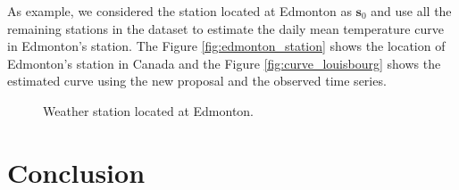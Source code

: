 \documentclass[12pt]{interact}
\theoremstyle{plain}%
\theoremstyle{definition}
\theoremstyle{remark}
\begin{document}
As example, we considered the station located at Edmonton as \(\bm{s}_0\) and use all the remaining stations in the dataset to estimate the daily mean temperature curve in Edmonton's station. The Figure \ref{fig:edmonton_station} shows the location of Edmonton's station in Canada and the Figure \ref{fig:curve_louisbourg} shows the estimated curve using the new proposal and the observed time series.
\begin{figure}[htbp]
	\hfill
	
	\caption{Weather station located at Edmonton.}
\end{figure}

\section{Conclusion}\label{sec:conclusion}
\end{document}
